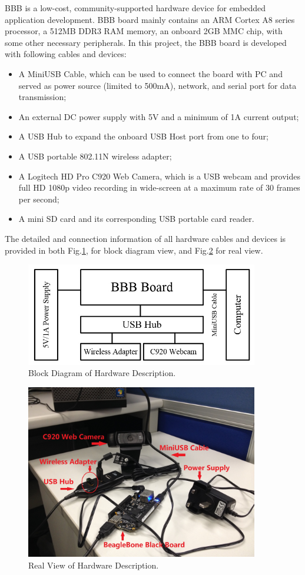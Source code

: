 \documentclass[12pt,journal,draftclsnofoot,onecolumn]{IEEEtran}
\begin{document}
BBB is a low-cost, community-supported hardware device for embedded application development. BBB board mainly contains an ARM Cortex A8 series processor, a 512MB DDR3 RAM memory, an onboard 2GB MMC chip, with some other necessary peripherals. In this project, the BBB board is developed with following cables and devices: 
\begin{itemize}
\item A MiniUSB Cable, which can be used to connect the board with PC and served as power source (limited to 500mA), network, and serial port for data transmission;
\item An external DC power supply with 5V and a minimum of 1A current output;
\item A USB Hub to expand the onboard USB Host port from one to four;
\item A USB portable 802.11N wireless adapter;
\item A Logitech HD Pro C920 Web Camera, which is a USB webcam and provides full HD 1080p video recording in wide-screen at a maximum rate of 30 frames per second;
\item A mini SD card and its corresponding USB portable card reader.
\end{itemize}
The detailed and connection information of all hardware cables and devices is provided in both Fig.\ref{hw1}, for block diagram view, and Fig.\ref{hw2} for real view.
\begin{figure}[ht]
	\centering
	\includegraphics[width=4in]{./figs/hw1.jpg}
	\caption{Block Diagram of Hardware Description.}
	\label{hw1}
\end{figure}
\begin{figure}[ht]
	\centering
	\includegraphics[width=4in]{./figs/hw2.jpg}
	\caption{Real View of Hardware Description.}
	\label{hw2}
\end{figure}
\end{document}
